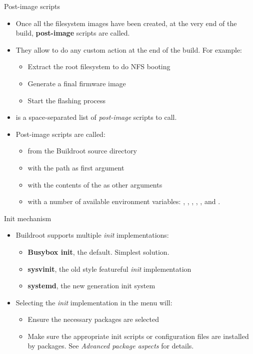 \begin{frame}{Post-image scripts}
  \begin{itemize}
  \item Once all the filesystem images have been created, at the very
    end of the build, {\bf post-image} scripts are called.
  \item They allow to do any custom action at the end of the
    build. For example:
    \begin{itemize}
    \item Extract the root filesystem to do NFS booting
    \item Generate a final firmware image
    \item Start the flashing process
    \end{itemize}
  \item {} is a space-separated list
    of {\em post-image} scripts to call.
  \item Post-image scripts are called:
    \begin{itemize}
    \item from the Buildroot source directory
    \item with the  path as first argument
    \item with the contents of the  as other arguments
    \item with a number of available environment variables:
      , , ,
      , ,  and
      .
    \end{itemize}
  \end{itemize}
\end{frame}

\begin{frame}{Init mechanism}
  \begin{itemize}
  \item Buildroot supports multiple {\em init} implementations:
    \begin{itemize}
    \item {\bf Busybox init}, the default. Simplest solution.
    \item {\bf sysvinit}, the old style featureful {\em init}
      implementation
    \item {\bf systemd}, the new generation init system
    \end{itemize}
  \item Selecting the {\em init} implementation in the  menu will:
    \begin{itemize}
    \item Ensure the necessary packages are selected
    \item Make sure the appropriate init scripts or configuration
      files are installed by packages. See {\em Advanced package
        aspects} for details.
    \end{itemize}
  \end{itemize}
\end{frame}

